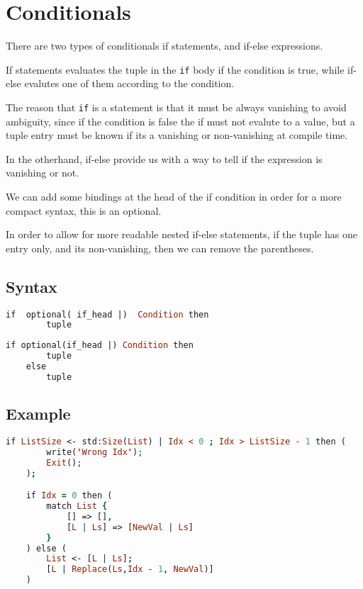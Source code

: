 \section{Conditionals}

There are two types of conditionals if statements, and if-else
expressions.

If statements evaluates the tuple in the \texttt{if} body if the
condition is true, while if-else evalutes one of them according to
the condition.

The reason that \texttt{if} is a statement is that it must be always
vanishing to avoid ambiguity, since if the condition is false the if
must not evalute to a value, but a tuple entry must be known if its a
vanishing or non-vanishing at compile time.

In the otherhand, if-else provide us with a way to tell if the
expression is vanishing or not.

We can add some bindings at the head of the if condition in order for
a more compact syntax, this is an optional.

In order to allow for more readable nested if-else statements, if the
tuple has one entry only, and its non-vanishing, then we can remove
the parentheses.

\subsection{Syntax}
\begin{lstlisting}[language =Prolog]
    if  optional( if_head |)  Condition then 
        tuple
\end{lstlisting}

\begin{lstlisting}[language =Prolog]
    if optional(if_head |) Condition then 
        tuple
    else 
        tuple
\end{lstlisting}

\subsection{Example}

\begin{lstlisting}[language =Prolog]
    if ListSize <- std:Size(List) | Idx < 0 ; Idx > ListSize - 1 then (
        write('Wrong Idx');
        Exit();
    );

    if Idx = 0 then (
        match List {
            [] => [],
            [L | Ls] => [NewVal | Ls]
        }
    ) else (
        List <- [L | Ls]; 
        [L | Replace(Ls,Idx - 1, NewVal)]
    )
    \end{lstlisting}

